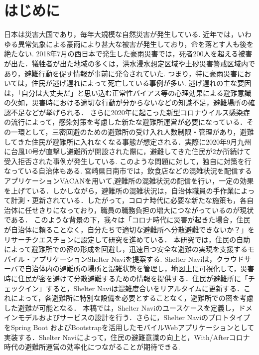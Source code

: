 \documentclass[technicalreport,dvipdfmx]{ieicej}
\begin{document}
\section{はじめに}
日本は災害大国であり，毎年大規模な自然災害が発生している. 近年では，いわゆる異常気象による豪雨により甚大な被害が発生しており，命を落とす人も後を絶たない. 2018年7月の西日本で発生した豪雨災害では，死者200人を超える被害が出た\cite{1}．犠牲者が出た地域の多くは，洪水浸水想定区域や土砂災害警戒区域内であり，避難行動を促す情報が事前に発令されていた. つまり，特に豪雨災害においては，住民が逃げ遅れによって死亡している事例が多い. 逃げ遅れの主な要因は，「自分は大丈夫だ」と思い込む正常性バイアス等の心理効果による避難意識の欠如\cite{2,3,4}，災害時における適切な行動が分からないなどの知識不足，避難場所の確認不足などが挙げられる\cite{5}．
さらに2020年に起こった新型コロナウイルス感染症の流行によって，感染対策を考慮した新たな避難所運営が必要になっている\cite{7}．その一環として，三密回避のための避難所の受け入れ人数制限・管理があり，避難してきた住民が避難所に入れなくなる事態が想定される．実際に2020年9月九州に台風10号が直撃し避難所が開設された際に，避難してきた住民が2か所続けて受入拒否された事例が発生している\cite{8}. 
このような問題に対して，独自に対策を行なっている自治体もある. 宮崎県日南市では，飲食店などの混雑状況を配信するアプリケーションVACANを用いて,避難所の混雑状況の配信を行い，一定の効果を上げている\cite{9}．しかしながら，避難所の混雑状況は，自治体職員の手作業によって計測・更新されている．したがって，コロナ時代に必要な新たな施策も，各自治体に任せきりになっており，職員の職務負担の増大につながっているのが現状である．
このような背景の下，我々は「コロナ時代に災害が起きた場合，住民が自治体に頼ることなく，自分たちで適切な避難所へ分散避難できないか？」をリサーチクエスチョンに設定して研究を進めている．
本研究では，住民の自助によって避難所での密の形成を回避し，迅速且つ安全な避難の実現を支援するモバイル・アプリケーションShelter Naviを提案する. Shelter Naviは，クラウドサーバで自治体内の避難所の場所と混雑状態を管理し，地図上に可視化して，災害時に住民が密を避けて分散避難するための情報を提供する．住民が避難所に「チェックイン」すると，Shelter Naviは混雑度合いをリアルタイムに更新する．これによって，各避難所に特別な設備を必要とすることなく，避難所での密を考慮した避難が可能となる．
本稿では，Shelter Naviのユースケースを定義し，ドメインモデルおよびサービスの設計を行う．さらに，Shelter NaviのプロトタイプをSpring Boot \cite{10}およびBootstrapを活用したモバイルWebアプリケーションとして実装する．Shelter Naviによって，住民の避難意識の向上と，With/Afterコロナ時代の避難所運営の効率化につながることが期待できる.
\end{document}
